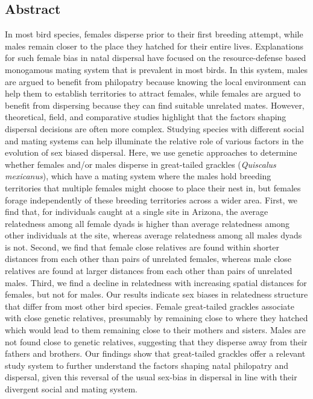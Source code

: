 \documentclass[
]{article}
\begin{document}
\hypertarget{abstract}{%
\subsection{Abstract}\label{abstract}}

In most bird species, females disperse prior to their first breeding
attempt, while males remain closer to the place they hatched for their
entire lives. Explanations for such female bias in natal dispersal have
focused on the resource-defense based monogamous mating system that is
prevalent in most birds. In this system, males are argued to benefit
from philopatry because knowing the local environment can help them to
establish territories to attract females, while females are argued to
benefit from dispersing because they can find suitable unrelated mates.
However, theoretical, field, and comparative studies highlight that the
factors shaping dispersal decisions are often more complex. Studying
species with different social and mating systems can help illuminate the
relative role of various factors in the evolution of sex biased
dispersal. Here, we use genetic approaches to determine whether females
and/or males disperse in great-tailed grackles (\emph{Quiscalus
mexicanus}), which have a mating system where the males hold breeding
territories that multiple females might choose to place their nest in,
but females forage independently of these breeding territories across a
wider area. First, we find that, for individuals caught at a single site
in Arizona, the average relatedness among all female dyads is higher
than average relatedness among other individuals at the site, whereas
average relatedness among all males dyads is not. Second, we find that
female close relatives are found within shorter distances from each
other than pairs of unrelated females, whereas male close relatives are
found at larger distances from each other than pairs of unrelated males.
Third, we find a decline in relatedness with increasing spatial
distances for females, but not for males. Our results indicate sex
biases in relatedness structure that differ from most other bird
species. Female great-tailed grackles associate with close genetic
relatives, presumably by remaining close to where they hatched which
would lead to them remaining close to their mothers and sisters. Males
are not found close to genetic relatives, suggesting that they disperse
away from their fathers and brothers. Our findings show that
great-tailed grackles offer a relevant study system to further
understand the factors shaping natal philopatry and dispersal, given
this reversal of the usual sex-bias in dispersal in line with their
divergent social and mating system.
\end{document}
